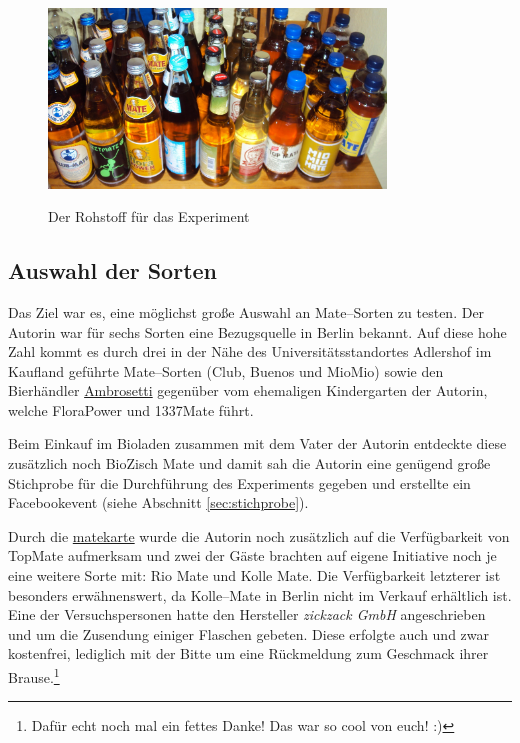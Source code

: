 \documentclass[11pt,a4paper,ngerman]{article}
\begin{document}
\begin{figure}[hb]
 \centering
 \caption{Der Rohstoff für das Experiment}
 \includegraphics[width=0.8\textwidth]{./Fotos/Matesorten.JPG}
 \label{fig:flaschen}
\end{figure}

\subsection{Auswahl der Sorten}\label{sec:sorten-auswahl}
Das Ziel war es, eine möglichst große Auswahl an Mate--Sorten zu testen. Der Autorin war für sechs Sorten eine Bezugsquelle in Berlin bekannt. Auf diese hohe Zahl kommt es durch drei in der Nähe des Universitätsstandortes Adlershof im Kaufland geführte Mate--Sorten (Club, Buenos und MioMio) sowie den Bierhändler \href{http://www.ambrosetti.de/}{Ambrosetti} gegenüber vom ehemaligen Kindergarten der Autorin, welche FloraPower und 1337Mate führt. 

Beim Einkauf im Bioladen zusammen mit dem Vater der Autorin entdeckte diese zusätzlich noch BioZisch Mate und damit sah die Autorin eine genügend große Stichprobe für die Durchführung des Experiments gegeben und erstellte ein Facebookevent (siehe Abschnitt \ref{sec:stichprobe}).

Durch die \href{http://www.matekarte.de/}{matekarte} wurde die Autorin noch zusätzlich auf die Verfügbarkeit von TopMate aufmerksam und zwei der Gäste brachten auf eigene Initiative noch je eine weitere Sorte mit: Rio Mate und Kolle Mate. Die Verfügbarkeit letzterer ist besonders erwähnenswert, da Kolle--Mate in Berlin nicht im Verkauf erhältlich ist. Eine der Versuchspersonen hatte den Hersteller \textit{zickzack GmbH} angeschrieben und um die Zusendung einiger Flaschen gebeten. Diese erfolgte auch und zwar kostenfrei, lediglich mit der Bitte um eine Rückmeldung zum Geschmack ihrer Brause.\footnote{Dafür echt noch mal ein fettes Danke! Das war so cool von euch! :)\footnotemark}
\end{document}
